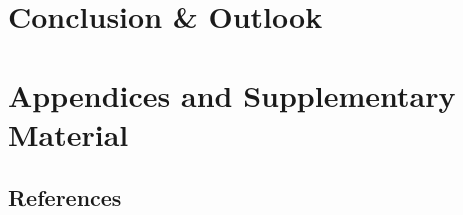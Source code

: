 \documentclass{dissertation}
\begin{document}


\part{Conclusion \& Outlook}\label{part:conclusion}


\part{Appendices and Supplementary Material}\label{part:appendices}
\appendix





\thumbfalse

\chapter*{References}


% 
% 
% 




\printabbreviations[title={Abbreviations}]

% 


\end{document}
